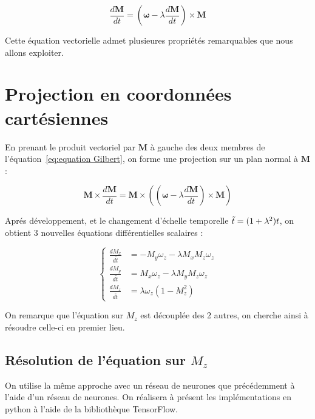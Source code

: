 \documentclass[12pt]{report}
\begin{document}
\begin{equation}
    \frac{d\bm{M}}{dt} = (\bm{\omega}-\lambda \frac{d{\bm{M}}}{dt})\times\bm{M} 
    \label{eq:equation Gilbert}
\end{equation}

Cette équation vectorielle admet plusieures propriétés remarquables que nous allons exploiter.

\section{Projection en coordonnées cartésiennes}
\label{sec:projection_cartesiennes}

En prenant le produit vectoriel par $\bm M$ à gauche des deux membres de l'équation~\ref{eq:equation Gilbert}, on forme une projection sur un plan normal à $\bm{M}$ :

\begin{equation}
    \bm{M}\times\frac{d\bm{M}}{dt} = \bm{M}\times((\bm{\omega}-\lambda \frac{d{\bm{M}}}{dt})\times\bm{M} )
    \label{eq:equation Gilbert produit vectoriel}
\end{equation}

Aprés développement, et le changement d'échelle temporelle $\Tilde{t} = (1+\lambda^2)t$, on obtient 3 nouvelles équations différentielles scalaires :

\begin{equation}
    \left\{
        \begin{aligned}
            \frac{dM_x}{d\tilde{t}} &= - M_y\omega_z - \lambda M_x M_z \omega_z \\
            \frac{dM_y}{d\tilde{t}} &= M_x\omega_z - \lambda M_y M_z \omega_z \\
            \frac{dM_z}{d\tilde{t}} &= \lambda\omega_z (1-M_z^2) 
        \end{aligned} 
    \right. 
    \label{eq:equations scalaires Gilbert}
\end{equation}

On remarque que l'équation sur $M_z$ est découplée des 2 autres, on cherche ainsi à résoudre celle-ci en premier lieu.

\subsection{Résolution de l'équation sur $M_z$}


On utilise la même approche avec un réseau de neurones que précédemment à l'aide d'un réseau de neurones.
On réalisera à présent les implémentations en python à l'aide de la bibliothèque TensorFlow.
\end{document}
